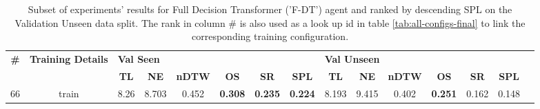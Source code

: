 \begin{table}
\centering
\caption{\label{tab:f_dt_rezero}Subset of experiments' results for Full Decision Transformer ('F-DT') agent and ranked by descending SPL on the Validation Unseen data split. The rank in column \# is also used as a look up id in table \ref{tab:all-configs-final} to link the corresponding training configuration.}
\begin{tabular}{@{\hskip3pt}c@{\hskip3pt}c@{\hskip3pt}c@{\hskip3pt}c@{\hskip3pt}c@{\hskip3pt}c@{\hskip3pt}c@{\hskip3pt}c@{\hskip3pt}c@{\hskip3pt}c@{\hskip3pt}c@{\hskip3pt}c@{\hskip3pt}c@{\hskip3pt}c@{\hskip3pt}c}
\toprule
\textbf{\#} & \textbf{Training Details} & \multicolumn{6}{l}{\textbf{Val Seen}} & \multicolumn{6}{l}{\textbf{Val Unseen}} \\
 \textbf{~} &                \textbf{~} &       \textbf{TL} & \textbf{NE} & \textbf{nDTW} &     \textbf{OS} &     \textbf{SR} &    \textbf{SPL} &         \textbf{TL} & \textbf{NE} & \textbf{nDTW} &     \textbf{OS} & \textbf{SR} & \textbf{SPL} \\
\midrule
         66 &                     train &              8.26 &       8.703 &         0.452 &  \textbf{0.308} &  \textbf{0.235} &  \textbf{0.224} &               8.193 &       9.415 &         0.402 &  \textbf{0.251} &       0.162 &        0.148 \\
\bottomrule
\end{tabular}
\end{table}
